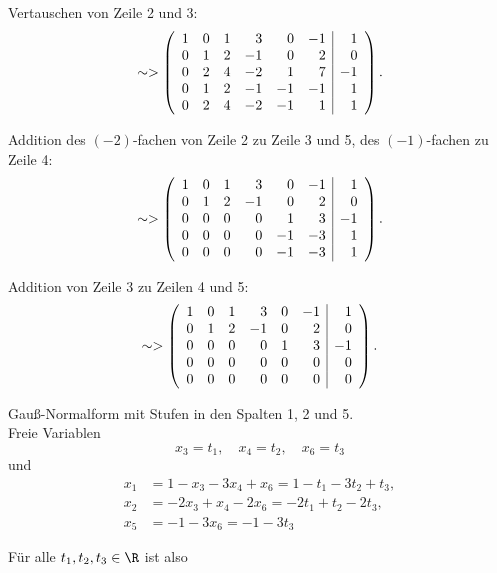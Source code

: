 Vertauschen von  Zeile 2 und 3:
$$
	\sim>
	\left(
	\begin{array}{rrrrrr | r}
		1	& 0	& 1	& 3	& 0	& -1	& 1\\	
		0	& 1	& 2	& -1	& 0	& 2	& 0\\
		0	& 2	& 4	& -2 	& 1	& 7	& -1\\
		0	& 1	& 2	& -1	& -1	& -1	& 1\\
		0	& 2	& 4	& -2	& -1	& 1	& 1
	\end{array}
	\right).
$$

Addition des $(-2)$-fachen von Zeile 2 zu Zeile 3 und 5, des $(-1)$-fachen zu Zeile 4:
$$
	\sim>
	\left(
	\begin{array}{rrrrrr | r}
		1	& 0	& 1	& 3	& 0	& -1	& 1\\	
		0	& 1	& 2	& -1	& 0	& 2	& 0\\
		0	& 0	& 0	& 0 	& 1	& 3	& -1\\
		0	& 0	& 0	& 0	& -1	& -3	& 1\\
		0	& 0	& 0	& 0	& -1	& -3	& 1
	\end{array}
	\right).
$$

Addition von Zeile 3 zu Zeilen 4 und 5:
$$
	\sim>
	\left(
	\begin{array}{rrrrrr | r}
		1	& 0	& 1	& 3	& 0	& -1	& 1\\	
		0	& 1	& 2	& -1	& 0	& 2	& 0\\
		0	& 0	& 0	& 0 	& 1	& 3	& -1\\
		0	& 0	& 0	& 0	& 0	& 0	& 0\\
		0	& 0	& 0	& 0	& 0	& 0	& 0
	\end{array}
	\right).
$$

Gau{\ss}-Normalform mit Stufen in den Spalten 1, 2 und 5.\\

Freie Variablen
$$
	x_3 = t_1,\quad x_4 = t_2,\quad x_6 = t_3
$$
und
\begin{align*}
	x_1	&= 1 - x_3 - 3x_4 + x_6	= 1 - t_1 - 3t_2 + t_3,	\\
	x_2	&= -2x_3 + x_4-2x_6 	= -2t_1 + t_2 -2t_3,	\\
	x_5	&= -1 - 3x_6 			= -1 - 3t_3							
\end{align*}

F\"ur alle $t_1, t_2, t_3 \in \R$ ist also

